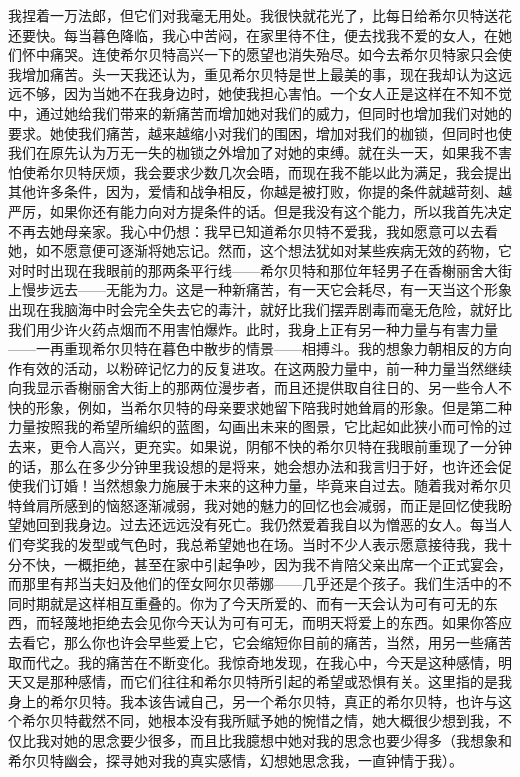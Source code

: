 \par 我捏着一万法郎，但它们对我毫无用处。我很快就花光了，比每日给希尔贝特送花还要快。每当暮色降临，我心中苦闷，在家里待不住，便去找我不爱的女人，在她们怀中痛哭。连使希尔贝特高兴一下的愿望也消失殆尽。如今去希尔贝特家只会使我增加痛苦。头一天我还认为，重见希尔贝特是世上最美的事，现在我却认为这远远不够，因为当她不在我身边时，她使我担心害怕。一个女人正是这样在不知不觉中，通过她给我们带来的新痛苦而增加她对我们的威力，但同时也增加我们对她的要求。她使我们痛苦，越来越缩小对我们的围困，增加对我们的枷锁，但同时也使我们在原先认为万无一失的枷锁之外增加了对她的束缚。就在头一天，如果我不害怕使希尔贝特厌烦，我会要求少数几次会晤，而现在我不能以此为满足，我会提出其他许多条件，因为，爱情和战争相反，你越是被打败，你提的条件就越苛刻、越严厉，如果你还有能力向对方提条件的话。但是我没有这个能力，所以我首先决定不再去她母亲家。我心中仍想：我早已知道希尔贝特不爱我，我如愿意可以去看她，如不愿意便可逐渐将她忘记。然而，这个想法犹如对某些疾病无效的药物，它对时时出现在我眼前的那两条平行线——希尔贝特和那位年轻男子在香榭丽舍大街上慢步远去——无能为力。这是一种新痛苦，有一天它会耗尽，有一天当这个形象出现在我脑海中时会完全失去它的毒汁，就好比我们摆弄剧毒而毫无危险，就好比我们用少许火药点烟而不用害怕爆炸。此时，我身上正有另一种力量与有害力量——一再重现希尔贝特在暮色中散步的情景——相搏斗。我的想象力朝相反的方向作有效的活动，以粉碎记忆力的反复进攻。在这两股力量中，前一种力量当然继续向我显示香榭丽舍大街上的那两位漫步者，而且还提供取自往日的、另一些令人不快的形象，例如，当希尔贝特的母亲要求她留下陪我时她耸肩的形象。但是第二种力量按照我的希望所编织的蓝图，勾画出未来的图景，它比起如此狭小而可怜的过去来，更令人高兴，更充实。如果说，阴郁不快的希尔贝特在我眼前重现了一分钟的话，那么在多少分钟里我设想的是将来，她会想办法和我言归于好，也许还会促使我们订婚！当然想象力施展于未来的这种力量，毕竟来自过去。随着我对希尔贝特耸肩所感到的恼怒逐渐减弱，我对她的魅力的回忆也会减弱，而正是回忆使我盼望她回到我身边。过去还远远没有死亡。我仍然爱着我自以为憎恶的女人。每当人们夸奖我的发型或气色时，我总希望她也在场。当时不少人表示愿意接待我，我十分不快，一概拒绝，甚至在家中引起争吵，因为我不肯陪父亲出席一个正式宴会，而那里有邦当夫妇及他们的侄女阿尔贝蒂娜——几乎还是个孩子。我们生活中的不同时期就是这样相互重叠的。你为了今天所爱的、而有一天会认为可有可无的东西，而轻蔑地拒绝去会见你今天认为可有可无，而明天将爱上的东西。如果你答应去看它，那么你也许会早些爱上它，它会缩短你目前的痛苦，当然，用另一些痛苦取而代之。我的痛苦在不断变化。我惊奇地发现，在我心中，今天是这种感情，明天又是那种感情，而它们往往和希尔贝特所引起的希望或恐惧有关。这里指的是我身上的希尔贝特。我本该告诫自己，另一个希尔贝特，真正的希尔贝特，也许与这个希尔贝特截然不同，她根本没有我所赋予她的惋惜之情，她大概很少想到我，不仅比我对她的思念要少很多，而且比我臆想中她对我的思念也要少得多（我想象和希尔贝特幽会，探寻她对我的真实感情，幻想她思念我，一直钟情于我）。
